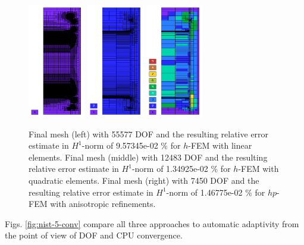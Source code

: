 \documentclass[12pt]{elsarticle}
\begin{document}
\begin{figure}[!ht]
\centering
\includegraphics[height=5cm]{nist/nist-5/mesh_h1_aniso.png}
\includegraphics[height=5cm]{nist/nist-5/mesh_h2_aniso.png}
\includegraphics[height=5cm]{nist/nist-5/mesh_hp_aniso.png}
\caption{
Final mesh (left) with 55577 DOF and the resulting
relative error estimate in $H^1$-norm of 9.57345e-02 \% for $h$-FEM with linear elements.
Final mesh (middle) with 12483 DOF and the resulting
relative error estimate in $H^1$-norm of 1.34925e-02 \% for $h$-FEM with quadratic elements.
Final mesh (right) with 7450 DOF and the resulting
relative error estimate in $H^1$-norm of 1.46775e-02 \% for $hp$-FEM with anisotropic refinements.}
\label{fig:nist-5-hp-aniso}
\end{figure}

Figs. \ref{fig:nist-5-conv} compare all
three approaches to automatic adaptivity from the point
of view of DOF and CPU convergence.
\end{document}
